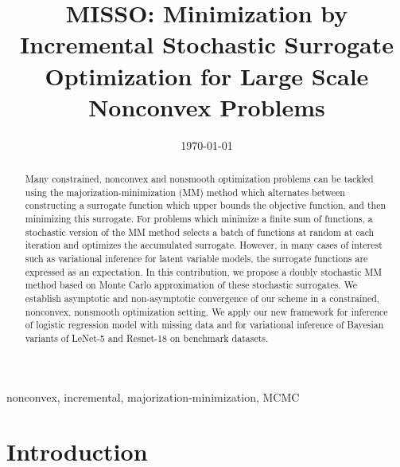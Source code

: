 \documentclass[final,12pt]{alt2022} %
\title[ Minimization by Incremental Stochastic Surrogate]{MISSO: Minimization by Incremental Stochastic Surrogate Optimization for Large Scale Nonconvex Problems}
\begin{document}
\maketitle


\date{\today}


\begin{abstract}
Many constrained, nonconvex and nonsmooth optimization problems can be tackled using the majorization-minimization (MM) method which alternates between constructing a surrogate function which upper bounds the objective function, and then minimizing this surrogate.
For problems which minimize a finite sum of functions, a stochastic version of the MM method selects a batch of functions at random at each iteration and optimizes the accumulated surrogate.
However, in many cases of interest such as variational inference for latent variable models, the surrogate functions are expressed as an expectation. In this contribution, we propose a doubly stochastic MM method based on Monte Carlo approximation of these stochastic surrogates.
We establish asymptotic and non-asymptotic convergence of our scheme in a constrained, nonconvex, nonsmooth optimization setting.
We apply our new framework for inference of logistic regression model with missing data and for variational inference of Bayesian variants of LeNet-5 and Resnet-18 on benchmark datasets.
\end{abstract}

\begin{keywords}%
  nonconvex, incremental, majorization-minimization, MCMC%
\end{keywords}

\vspace{-0.1in}
\section{Introduction}
\vspace{-0.05in}
\end{document}
